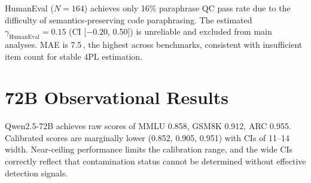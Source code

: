 \documentclass[11pt,a4paper]{article}
\newcommand{\pp}{\,\text{pp}}
\begin{document}
HumanEval ($N=164$) achieves only 16\% paraphrase QC pass rate due to the difficulty of semantics-preserving code paraphrasing. The estimated $\gamma_\text{HumanEval} = 0.15$ (CI [$-0.20$, 0.50]) is unreliable and excluded from main analyses. MAE is 7.5\pp{}, the highest across benchmarks, consistent with insufficient item count for stable 4PL estimation.

\section{72B Observational Results}
\label{app:72b}

Qwen2.5-72B achieves raw scores of MMLU 0.858, GSM8K 0.912, ARC 0.955. Calibrated scores are marginally lower (0.852, 0.905, 0.951) with CIs of 11--14\pp{} width. Near-ceiling performance limits the calibration range, and the wide CIs correctly reflect that contamination status cannot be determined without effective detection signals.
\end{document}
